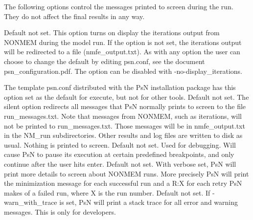 The following options control the messages printed to screen during the run. They do not affect the final results in any way.
\begin{optionlist}
Default not set.  This option turns on display the iterations output from NONMEM during the model run. If the option is not set, the iterations output will be redirected to a file (nmfe\_output.txt). As with any option the user can choose to change the default by editing psn.conf, see the document psn\_configuration.pdf. The option can be disabled with -no-display\_iterations.

The template psn.conf distributed with the PsN installation package has this option set as the default for execute, but not for other tools.  
\nextopt
{}
Default not set. The silent option redirects all messages that PsN normally prints to screen to the file run\_messages.txt. Note that messages from NONMEM, such as iterations, will not be printed to run\_messages.txt. Those messages will be in nmfe\_output.txt in the NM\_run subdirectories. Other results and log files are written to disk as usual. Nothing is printed to screen. 
\nextopt
{}
Default not set. Used for debugging. Will cause PsN to pause its execution at certain predefined breakpoints, and only continue after the user hits enter.
\nextopt
{}
Default not set. With verbose set, PsN will print more details to screen about NONMEM runs. More precisely PsN will print the minimization message for each successful run and a R:X for each retry PsN makes of a failed run, where X is the run number. 
\nextopt
{}
Default not set. If -warn\_with\_trace is set, PsN will print a stack trace for all error and warning messages. This is only for developers. 
\nextopt
\end{optionlist}
